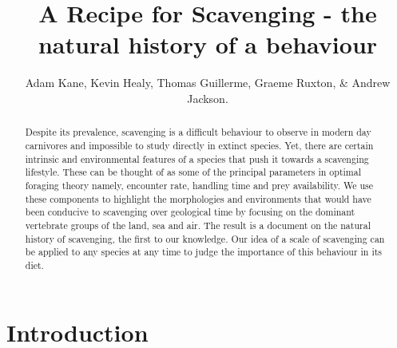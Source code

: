 \documentclass[a4paper,12pt]{article}
\title{A Recipe for Scavenging - the natural history of a behaviour}
\author{Adam Kane, Kevin Healy, Thomas Guillerme, Graeme Ruxton, \& Andrew Jackson.}
\begin{document}
 \maketitle


\begin{abstract} 
Despite its prevalence, scavenging is a difficult behaviour to observe in modern day carnivores and impossible to study directly in extinct species. 
Yet, there are certain intrinsic and environmental features of a species that push it towards a scavenging lifestyle. 
These can be thought of as some of the principal parameters in optimal foraging theory namely, encounter rate, handling time and prey availability. 
We use these components to highlight the morphologies and environments that would have been conducive to scavenging over geological time by focusing on the dominant vertebrate groups of the land, sea and air. 
The result is a document on the natural history of scavenging, the first to our knowledge. 
Our idea of a scale of scavenging can be applied to any species at any time to judge the importance of this behaviour in its diet. 
\end{abstract}

\newpage


\section*{Introduction}
\end{document}
